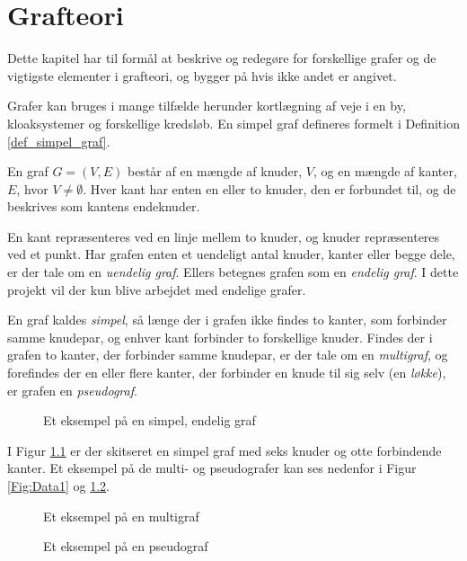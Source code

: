 \chapter{Grafteori}
\usetikzlibrary{arrows, automata}

Dette kapitel har til formål at beskrive og redegøre for forskellige grafer og de vigtigste elementer i grafteori, og bygger på \citep{dmat} hvis ikke andet er angivet. 

Grafer kan bruges i mange tilfælde herunder kortlægning af veje i en by, kloaksystemer og forskellige kredsløb.
En simpel graf defineres formelt i Definition \ref{def_simpel_graf}.


\begin{defn}
En graf $G = (V, E)$ består af en mængde af knuder, $V$, og en mængde af kanter, $E$, hvor $V \neq \emptyset$.
Hver kant har enten en eller to knuder, den er forbundet til, og de beskrives som kantens endeknuder.
\label{def_simpel_graf}
\end{defn}

En kant repræsenteres ved en linje mellem to knuder, og knuder repræsenteres ved et punkt.
Har grafen enten et uendeligt antal knuder, kanter eller begge dele, er der tale om en \textit{uendelig graf}.
Ellers betegnes grafen som en \textit{endelig graf}.
I dette projekt vil der kun blive arbejdet med endelige grafer.

\begin{defn}
En graf kaldes \textit{simpel}, så længe der i grafen ikke findes to kanter, som forbinder samme knudepar, og enhver kant forbinder to forskellige knuder. 
Findes der i grafen to kanter, der forbinder samme knudepar, er der tale om en \textit{multigraf}, og forefindes der en eller flere kanter, der forbinder en knude til sig selv (en \textit{løkke}), er grafen en \textit{pseudograf}.
\end{defn}

\begin{figure}[h]
	\centering
	
	\caption{Et eksempel på en simpel, endelig graf} \label{simpel_graf}
\end{figure}

I Figur \ref{simpel_graf} er der skitseret en simpel graf med seks knuder og otte forbindende kanter. Et eksempel på de multi- og pseudografer kan ses nedenfor i Figur \ref{Fig:Data1} og \ref{Fig:Data2}.

\begin{figure}[!htb]
   \begin{minipage}{0.48\textwidth}
     \centering
     
     \caption{Et eksempel på en multigraf}\label{Fig:Data1}
   \end{minipage}\hfill
   \begin{minipage}{0.48\textwidth}
     \centering
     
     \caption{Et eksempel på en pseudograf}\label{Fig:Data2}
   \end{minipage}
\end{figure}

